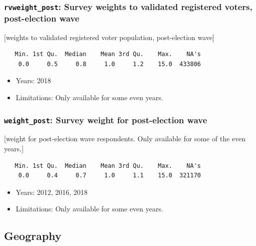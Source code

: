 \documentclass[10pt,article,oneside]{memoir}
\theoremstyle{definition}
\begin{document}
\hypertarget{rvweight_post-survey-weights-to-validated-registered-voters-post-election-wave}{%
\subsubsection{\texorpdfstring{\texttt{rvweight\_post}: Survey weights
to validated registered voters, post-election
wave}{rvweight\_post: Survey weights to validated registered voters, post-election wave}}\label{rvweight_post-survey-weights-to-validated-registered-voters-post-election-wave}}

{[}weights to validated registered voter population, post-election
wave{]}

\begin{verbatim}
   Min. 1st Qu.  Median    Mean 3rd Qu.    Max.    NA's 
    0.0     0.5     0.8     1.0     1.2    15.0  433806 
\end{verbatim}

\begin{itemize}
\tightlist
\item
  Years: 2018
\item
  Limitations: Only available for some even years.
\end{itemize}

\hypertarget{weight_post-survey-weight-for-post-election-wave}{%
\subsubsection{\texorpdfstring{\texttt{weight\_post}: Survey weight for
post-election
wave}{weight\_post: Survey weight for post-election wave}}\label{weight_post-survey-weight-for-post-election-wave}}

{[}weight for post-election wave respondents. Only available for some of
the even years.{]}

\begin{verbatim}
   Min. 1st Qu.  Median    Mean 3rd Qu.    Max.    NA's 
    0.0     0.4     0.7     1.0     1.1    15.0  321170 
\end{verbatim}

\begin{itemize}
\tightlist
\item
  Years: 2012, 2016, 2018
\item
  Limitations: Only available for some even years.
\end{itemize}

\hypertarget{geography}{%
\subsection{Geography}\label{geography}}
\end{document}
